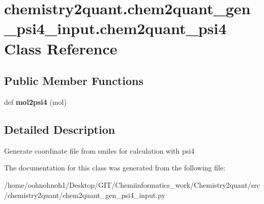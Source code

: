 \hypertarget{classchemistry2quant_1_1chem2quant__gen__psi4__input_1_1chem2quant__psi4}{}\section{chemistry2quant.\+chem2quant\+\_\+gen\+\_\+psi4\+\_\+input.\+chem2quant\+\_\+psi4 Class Reference}
\label{classchemistry2quant_1_1chem2quant__gen__psi4__input_1_1chem2quant__psi4}
\subsection*{Public Member Functions}
\begin{DoxyCompactItemize}
\item
\mbox{\label{classchemistry2quant_1_1chem2quant__gen__psi4__input_1_1chem2quant__psi4_a4f4edda32b6b38dc42328e220327aed2}}
def {\bfseries mol2psi4} (mol)
\end{DoxyCompactItemize}


\subsection{Detailed Description}
\begin{DoxyVerb}Generate coordinate file from smiles for calculation with
psi4
\end{DoxyVerb}


The documentation for this class was generated from the following file\+:\begin{DoxyCompactItemize}
\item
/home/oohnohnoh1/\+Desktop/\+G\+I\+T/\+Chemiinformatics\+\_\+work/\+Chemistry2quant/src/chemistry2quant/chem2quant\+\_\+gen\+\_\+psi4\+\_\+input.\+py\end{DoxyCompactItemize}
